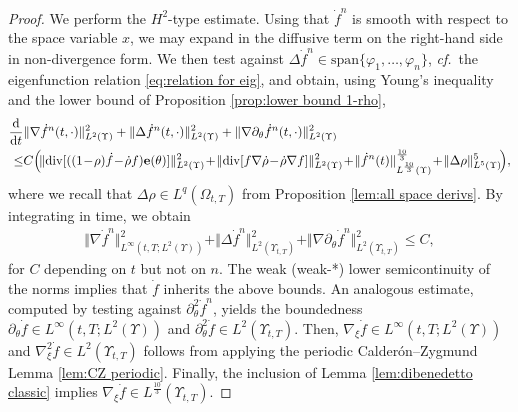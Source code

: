 \documentclass[11pt,a4paper,reqno]{amsart}
\theoremstyle{remark}
\theoremstyle{definition}
\numberwithin{equation}{section}
\DeclareMathOperator{\dv}{div}
\renewcommand{\span}{\mathrm{span}}
\newcommand{\e}{{\bf e}}
\newcommand{\bxi}{\xi}
\newcommand{\der}{\mathrm{d}}
\begin{document}
\begin{proof}
We perform the $H^2$-type estimate. Using that $\dot{f}^n$ is smooth with respect to the space variable $x$, we may expand in the diffusive term on the right-hand side in non-divergence form. We then test against $\Delta \dot{f}^n \in \span\{\varphi_1,\dots,\varphi_n\}$, \textit{cf.}~the eigenfunction relation \eqref{eq:relation for eig}, and obtain, using Young's inequality and the lower bound of Proposition \ref{prop:lower bound 1-rho}, 
\begin{equation*}
  \begin{aligned}  \frac{\der}{\der t}&\Vert \nabla \dot{f}^n(t,\cdot) \Vert^2_{L^2(\Upsilon)} + \Vert \Delta \dot{f}^n(t,\cdot) \Vert^2_{L^2(\Upsilon)} + \Vert \nabla \partial_\theta \dot{f}^n(t,\cdot) \Vert^2_{L^2(\Upsilon)} \\ 
  \leq & C \Big(\! \Vert \!\dv[((1\!-\!\rho)\dot{f} \!-\! \dot{\rho} f )\e(\theta) ]  \Vert^2_{L^2(\Upsilon)}  \!+\! \Vert  \! \dv [  f \nabla\dot{\rho} \!-\! \dot{\rho} \nabla f  ]\Vert^2_{L^2(\Upsilon)} \!+\! \Vert \dot{f}^n(t) \Vert^{\frac{10}{3}}_{L^{\frac{10}{3}}(\Upsilon)} \!+\! \Vert \Delta \rho \Vert^5_{L^5(\Upsilon)}  \!\Big), 
  \end{aligned}
\end{equation*}
where we recall that $\Delta \rho \in L^q(\Omega_{t,T})$ from Proposition \ref{lem:all space derivs}. By integrating in time, we obtain 
\begin{equation*}
    \begin{aligned}
        \Vert \nabla \dot{f}^n   \Vert^2_{L^\infty(t,T;L^2(\Upsilon))} +  \Vert \Delta \dot{f}^n   \Vert^2_{L^2(\Upsilon_{t,T})} + \Vert \nabla \partial_\theta \dot{f}^n \Vert^2_{L^2(\Upsilon_{t,T})} \leq C , 
    \end{aligned}
\end{equation*}
for $C$ depending on $t$ but not on $n$. The weak (weak-*) lower semicontinuity of the norms implies that $\dot{f}$ inherits the above bounds. An analogous estimate, computed by testing against $\partial^2_\theta \dot{f}^n$, yields the boundedness $\partial_\theta \dot{f} \in L^\infty(t,T;L^2(\Upsilon))$ and $\partial^2_\theta \dot{f} \in L^2(\Upsilon_{t,T})$. Then, $\nabla_{\bxi} \dot{f} \in L^\infty(t,T;L^2(\Upsilon))$ and $\nabla^2_{\bxi} \dot{f} \in L^2(\Upsilon_{t,T})$ follows from applying the periodic Calder\'on--Zygmund Lemma \ref{lem:CZ periodic}. Finally, the inclusion of Lemma \ref{lem:dibenedetto classic} implies $\nabla_{\bxi} \dot{f} \in L^{\frac{10}{3}}(\Upsilon_{t,T})$. 
\end{proof}
\end{document}
